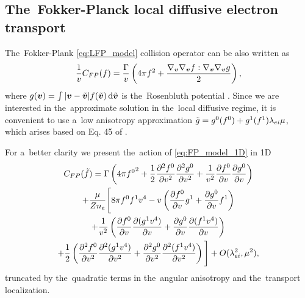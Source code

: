 \subsection{The~Fokker-Planck local diffusive electron transport}
\label{app:FPDiffusiveRegime}
\newcommand{\gt}{g}
\newcommand{\gM}{\gt_M}

The~Fokker-Plank \eqref{eq:LFP_model} collision operator can be also written as 
\cite{Shkarofsky_Particle_Kinetics_book_1966_24}
\begin{equation}
  \frac{1}{\vmag}C_{FP}(f) =  
  \frac{\Gamma}{\vmag} \left(4\pi f^2 
  + \frac{\gv\gv \ft : \gv\gv \gt}{2}\right) ,
  \label{eq:FP_model_1D}
\end{equation}
where $g(\boldsymbol{v}) = \int |\boldsymbol{v} - \tilde{\boldsymbol{v}}| f(\tilde{\boldsymbol{v}})\, \text{d}\tilde{\boldsymbol{v}}$ is 
the~Rosenbluth potential \cite{Rosenbluth_PR1957}. Since we are interested in 
the~approximate solution in the~local diffusive regime, it is convenient to
use a~low anisotropy approximation 
$\tilde{\gt} = \gt^0(f^0) + \gt^1(f^1) \mfpei \mu$, which arises based on 
Eq. 45 of \cite{Rosenbluth_PR1957}.

For a~better clarity we present the~action of \eqref{eq:FP_model_1D} in 1D
\begin{multline}
  C_{FP}(\tilde{f}) = 
  \Gamma\left(4\pi{\ft^0}^2 + 
  \frac{1}{2}\frac{\partial^2 \ft^0}{\partial \vmag^2}
  \frac{\partial^2 \gt^0}{\partial \vmag^2}
  + \frac{1}{\vmag^2}\pdv{\ft^0}{\vmag}\pdv{\gt^0}{\vmag} \right)
  \\
  + \frac{\mu}{\Zbar n_e}
  \Bigg[8\pi \ft^0 \ft^1\vmag^4 - \vmag\left(\pdv{\ft^0}{\vmag}\gt^1
  + \pdv{\gt^0}{\vmag}\ft^1\right) 
  \\
  + \frac{1}{\vmag^2}\left(\pdv{\ft^0}{\vmag}
  \pdv{(\gt^1\vmag^4)}{\vmag}
  + \pdv{\gt^0}{\vmag}\pdv{(\ft^1\vmag^4)}{\vmag}\right) \\
  + \frac{1}{2}\left(\frac{\partial^2 \ft^0}{\partial \vmag^2}
  \frac{\partial^2 (\gt^1\vmag^4)}{\partial \vmag^2}
  + \frac{\partial^2 \gt^0}{\partial \vmag^2} 
  \frac{\partial^2 (\ft^1\vmag^4)}{\partial \vmag^2}
  \right) \Bigg] + O(\mfpei^2, \mu^2) ,
  \label{eq:FP_truncation}
\end{multline}
truncated by the~quadratic terms in the~angular anisotropy and the~transport 
localization.

